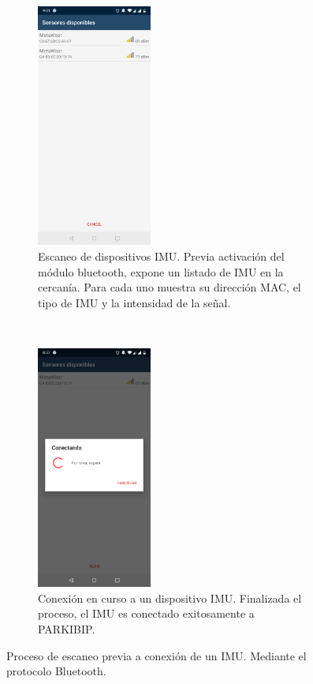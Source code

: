 \begin{figure}[!h]
     \centering
     \begin{subfigure}[t]{0.4\textwidth}
         \centering         \includegraphics[height=8cm]{TESIS/imagenes/chap05/activity-searching-imus.JPG}
         \caption{Escaneo de dispositivos IMU. Previa activación del módulo bluetooth, expone un listado de IMU en la cercanía. Para cada uno muestra su dirección MAC, el tipo de IMU y la intensidad de la señal.}
     \end{subfigure}
     ~
     \begin{subfigure}[t]{0.4\textwidth}
         \centering
         \includegraphics[height=8cm]{TESIS/imagenes/chap05/activity-connecting.JPG}
         \caption{Conexión en curso a un dispositivo IMU. Finalizada el proceso, el IMU es conectado exitosamente a PARKIBIP.}
     \end{subfigure}
     \caption{Proceso de escaneo previa a conexión de un IMU. Mediante el protocolo Bluetooth.}
     \label{fig:activity-scanning}
 \end{figure}

